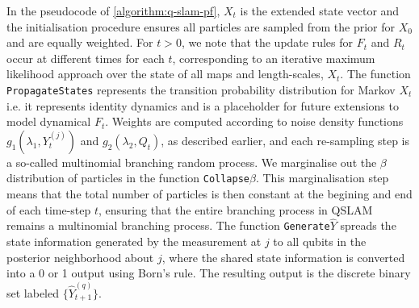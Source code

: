 In the pseudocode of \cref{algorithm:q-slam-pf}, $X_t$ is the extended state vector and the initialisation procedure ensures all particles are sampled from the prior for $X_0$ and are equally weighted. For $t>0$, we note that the update rules for $F_t$ and $R_t$ occur at different times for each $t$, corresponding to an iterative maximum likelihood approach over the state of all maps and length-scales, $X_t$. The function \texttt{PropagateStates} represents the transition probability distribution for Markov $X_t$ i.e. it represents identity dynamics and is a placeholder for future extensions to model dynamical $F_t$. Weights are computed according to noise density functions  $g_1(\lambda_1, Y_t^{(j)})$ and $g_2(\lambda_2, Q_t)$, as described earlier, and each re-sampling step is a so-called multinomial branching random process. We marginalise out the $\beta$ distribution of particles in the function \texttt{Collapse$\beta$}. This marginalisation step  means that the total number of particles is then constant at the begining and end of each time-step $t$, ensuring that the entire branching process in QSLAM remains a multinomial branching process. The function \texttt{Generate$\hat{Y}$} spreads the state information generated by the measurement at $j$ to all qubits in the posterior neighborhood about $j$, where the shared state information is converted into a 0 or 1 output using Born's rule. The resulting output is the discrete binary set labeled  $\{\hat{Y}_{t+1}^{(q)} \}$.